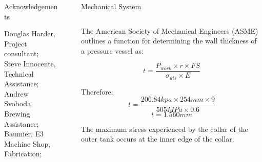 \documentclass[final]{beamer}
\newlength{\sepwid}
\newlength{\onecolwid}
\newlength{\twocolwid}
\begin{document}
\begin{frame}[t]
\begin{columns}[t]
\begin{column}{\onecolwid}
\begin{alertblock}{Acknowledgements}

\small{Douglas Harder, Project consultant; \\
Steve Innocente, Technical Assistance; \\
Andrew Svoboda, Brewing Assistance; \\
Baumier, E3 Machine Shop, Fabrication;}

\end{alertblock}

\end{column} %

\begin{column}{\sepwid}\end{column} %

\begin{column}{\twocolwid} %

\begin{block}{Mechanical System} 
\end{block}

\begin{columns}[t,totalwidth=\twocolwid] %

\begin{column}{\onecolwid}\vspace{-.6in} %


The American Society of Mechanical Engineers (ASME) outlines a function for determining the wall thickness of a pressure vessel as:

\begin{equation}
t = \frac{P_{work} \times r \times FS}{\sigma_{uts} \times E}
\end{equation}

\noindent Therefore:
\begin{equation}
t = \frac{206.84kpa \times 254mm \times 9}{505MPa \times 0.6}
\end{equation}
\begin{equation}
t = 1.560mm
\end{equation}

The maximum stress experienced by the collar of the outer tank occurs at the inner edge of the collar. 


\end{column}
\end{columns}
\end{column}
\end{columns}
\end{frame}
\end{document}
